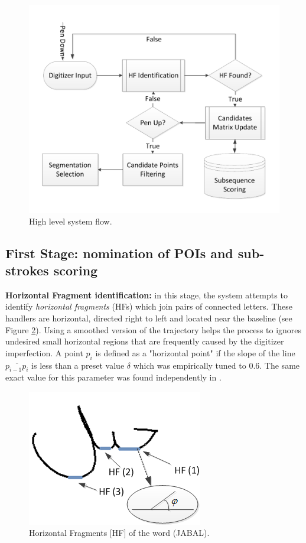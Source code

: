 \documentclass[10pt, conference, compsocconf]{IEEEtran}
\begin{document}
\begin{figure}
\centering
\includegraphics[width=0.9\columnwidth]{./figures/system_flow}
\caption{High level system flow.}
\label{fig:system_flow}
\end{figure}

\subsection{First Stage: nomination of POIs and sub-strokes scoring}

\textbf{Horizontal Fragment identification:} in this stage, the system attempts to identify \emph{horizontal fragments} (HFs) which join pairs of connected letters. 
These handlers are horizontal, directed right to left and located near the baseline (see Figure  \ref{fig:horizontal_fragments}). 
Using a smoothed version of the trajectory helps the process to ignores undesired small horizontal regions that are frequently caused by the digitizer imperfection.  
A point $p_{i}$ is defined as a "horizontal point" if the slope of the line $\overline{p_{i-1}p_{i}}$ is less than a preset value $\delta$ which was empirically tuned to $0.6$. The same exact value for this parameter was found independently in \cite{daifallah2009recognition}.\\

\begin{figure}
\centering
\includegraphics[width=0.5\columnwidth]{./figures/horizontal_fragments}
\caption{Horizontal Fragments [HF] of the word  (JABAL).}
\label{fig:horizontal_fragments}
\end{figure}
\end{document}
